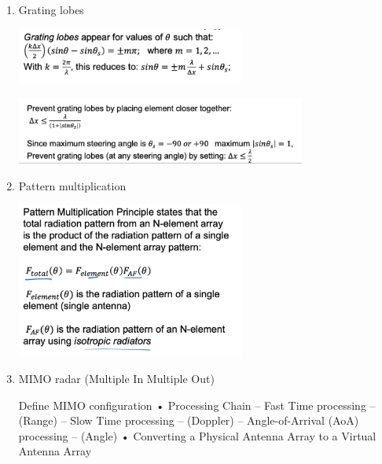 \documentclass[10pt]{article}
\begin{document}
\begin{enumerate}
\item{Grating lobes}

\includegraphics[width=0.59\textwidth]{figs/grating_lobes.png}

\includegraphics[width=0.75\textwidth]{figs/grating_lobes2.png}

\item{Pattern multiplication}

\includegraphics[width=0.59\textwidth]{figs/pattern_multiplication_principle.png}



\item{MIMO radar (Multiple In Multiple Out)}

Define MIMO configuration
• Processing Chain
– Fast Time processing – (Range)
– Slow Time processing – (Doppler)
– Angle-of-Arrival (AoA) processing – (Angle)
• Converting a Physical Antenna Array to a Virtual Antenna Array

















\end{enumerate}
\end{document}
